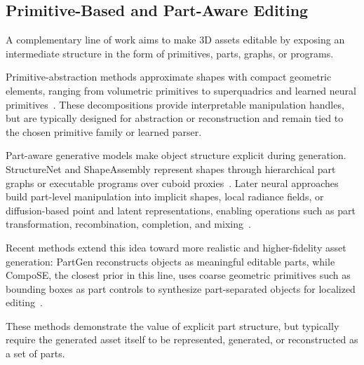 \subsection{Primitive-Based and Part-Aware Editing}
\label{sec:rw_part_primitive_editing}

A complementary line of work aims to make 3D assets editable by exposing an intermediate structure in the form of primitives, parts, graphs, or programs. 

Primitive-abstraction methods approximate shapes with compact geometric elements, ranging from volumetric primitives to superquadrics and learned neural primitives~\cite{abstractionTulsiani17,Paschalidou2019CVPR,Paschalidou2021CVPR}. These decompositions provide interpretable manipulation handles, but are typically designed for abstraction or reconstruction and remain tied to the chosen primitive family or learned parser.


Part-aware generative models make object structure explicit during generation. StructureNet and ShapeAssembly represent shapes through hierarchical part graphs or executable programs over cuboid proxies~\cite{MoGuerreroEtAl:StructureNet:SiggraphAsia:2019,jones2020shapeAssembly}. Later neural approaches build part-level manipulation into implicit shapes, local radiance fields, or diffusion-based point and latent representations, enabling operations such as part transformation, recombination, completion, and mixing~\cite{hertz2022spaghetti,Tertikas2023CVPR,koo2023salad,nakayama2023difffacto}.

Recent methods extend this idea toward more realistic and higher-fidelity asset generation: PartGen reconstructs objects as meaningful editable parts, while CompoSE, the closest prior in this line, uses coarse geometric primitives such as bounding boxes as part controls to synthesize part-separated objects for localized editing~\cite{Chen2025PartGen,slim2026composecompositionalsynthesisediting}.

These methods demonstrate the value of explicit part structure, but typically require the generated asset itself to be represented, generated, or reconstructed as a set of parts.


